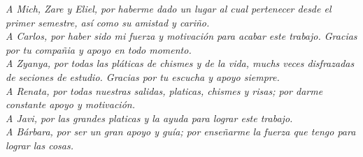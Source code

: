 \textit{A Mich, Zare y Eliel, por haberme dado un lugar al cual pertenecer desde
el primer semestre, as\'i como su amistad y cari\~{n}o.}\\

\textit{A Carlos, por haber sido mi fuerza y motivaci\'on para acabar este
trabajo. Gracias por tu compa\~{n}ia y apoyo en todo momento.}\\

\textit{A Zyanya, por todas las pl\'aticas de chismes y de la vida, muchs veces
disfrazadas de seciones de estudio. Gracias por tu escucha y apoyo siempre.}\\

\textit{A Renata, por todas nuestras salidas, platicas, chismes y risas; por
darme constante apoyo y motivaci\'on.}\\

\textit{A Javi, por las grandes platicas y la ayuda para lograr este trabajo.}\\

\textit{A B\'arbara, por ser un gran apoyo y gu\'ia; por ense\~{n}arme la fuerza
que tengo para lograr las cosas.}\\